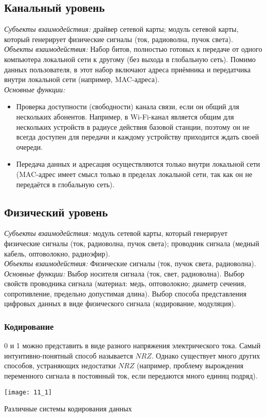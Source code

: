 \subsection{Канальный уровень}
\emph{Субъекты взаимодействия:} драйвер сетевой карты; модуль сетевой карты, который генерирует физические сигналы (ток, радиоволна, пучок света).
\\\emph{Объекты взаимодействия:} Набор битов, полностью готовых к передаче от одного компьютера локальной сети к другому (без выхода в глобальную сеть). Помимо данных пользователя, в этот набор включают адреса приёмника и передатчика внутри локальной сети (например, MAC-адреса).
\\\emph{Основные функции:}
\begin{itemize}
  \item Проверка доступности (свободности) канала связи, если он общий для нескольких абонентов. Например, в Wi-Fi-канал является общим для нескольких устройств в радиусе действия базовой станции, поэтому он не всегда доступен для передачи и каждому устройству приходится ждать своей очереди.
  \item Передача данных и адресация осуществляются только внутри локальной сети (MAC-адрес имеет смысл только в пределах локальной сети, так как он не передаётся в глобальную сеть).
\end{itemize}
\subsection{Физический уровень}
\emph{Субъекты взаимодействия:} модуль сетевой карты, который генерирует физические сигналы (ток, радиоволна, пучок света); проводник сигнала (медный кабель, оптоволокно, радиоэфир).
\\\emph{Объекты взаимодействия:} Физические сигналы (ток, пучок света, радиоволна).
\\\emph{Основные функции:} Выбор носителя сигнала (ток, свет, радиоволна). Выбор свойств проводника сигнала (материал: медь,
оптоволокно; диаметр сечения, сопротивление, предельно допустимая длина). Выбор способа представления цифровых данных в виде физического сигнала (кодирование, модуляция).
\subsubsection{Кодирование}
0 и 1 можно представить в виде разного напряжения электрического тока. Самый интуитивно-понятный способ называется $NRZ$. Однако существует много других способов, устраняющих недостатки $NRZ$ (например, проблему вырождения переменного сигнала в постоянный ток, если передаются много единиц подряд).
\\
\begin{minipage}{\textwidth}
\texttt{[image: 11\_1]}
\begin{center}
Различные системы кодирования данных
\end{center}
\end{minipage}
\\
